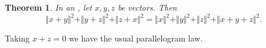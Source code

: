 \documentclass[12pt]{article}
\newtheorem*{thm}{Theorem}
\begin{document}
\begin{thm} In an , let $x,y,z$ be vectors. Then
$$
\Vert x+y\Vert^2 + \Vert y +z \Vert^2 + \Vert z +x \Vert^2 =
\Vert  x \Vert^2 + \Vert y \Vert^2 + \Vert z \Vert^2 + \Vert x + y +z \Vert^2.
$$
\end{thm} 

Taking $x+z=0$ we have the usual parallelogram law.


\end{document}

